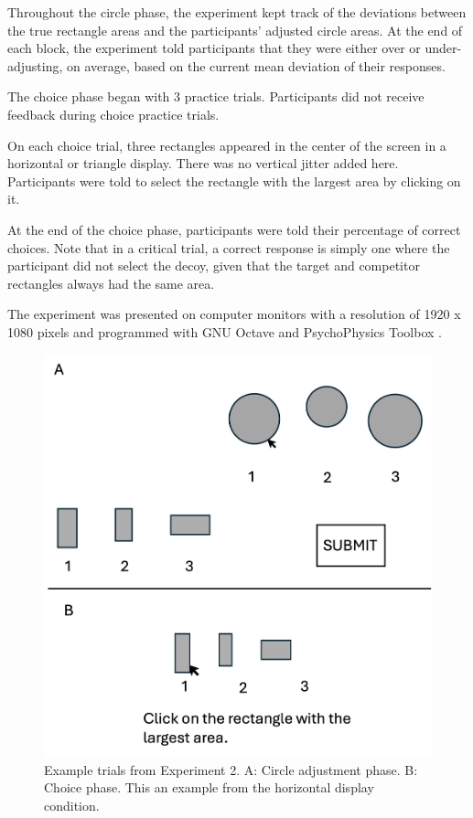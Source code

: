 Throughout the circle phase, the experiment  kept track of the deviations between the true rectangle areas and the participants' adjusted circle areas. At the end of each block, the experiment told participants that they were either over or under-adjusting, on average, based on the current mean deviation of their responses.

The choice phase began with 3 practice trials. Participants did not receive feedback during choice practice trials. 

On each choice trial, three rectangles appeared in the center of the screen in a horizontal or triangle display. There was no vertical jitter added here. Participants were told to select the rectangle with the largest area by clicking on it.

At the end of the choice phase, participants were told their percentage of correct choices. Note that in a critical trial, a correct response is simply one where the participant did not select the decoy, given that the target and competitor rectangles always had the same area.

The experiment was presented on computer monitors with a resolution of 1920 x 1080 pixels and programmed with GNU Octave \parencite{octave} and PsychoPhysics Toolbox \parencite{brainardPsychophysicsToolbox1997}. 

\begin{figure}
   \includegraphics[width=\linewidth]{figures/circle_exp_display.jpg}
   \caption{Example trials from Experiment 2. A: Circle adjustment phase. B: Choice phase. This an example from the horizontal display condition.}
   \label{fig:circle_exp_display}
\end{figure}

